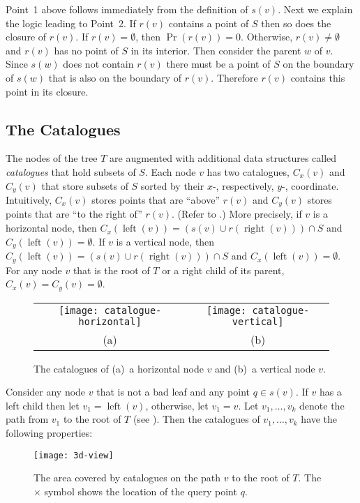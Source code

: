 \documentclass[charterfonts]{patmorin}
\DeclareMathOperator{\lft}{left}
\DeclareMathOperator{\rght}{right}
\begin{document}
Point~1 above follows immediately from the definition of $s(v)$. Next we
explain the logic leading to Point~2.  If $r(v)$ contains a point of $S$
then so does the closure of $r(v)$.   If $r(v)=\emptyset$, then $\Pr(r(v))
= 0$.  Otherwise, $r(v) \neq \emptyset$ and $r(v)$ has no point of $S$ in
its interior.  Then consider the parent $w$ of $v$.  Since $s(w)$ does not
contain $r(v)$ there must be a point of $S$ on the boundary of $s(w)$ that
is also on the boundary of $r(v)$.  Therefore $r(v)$ contains this point in
its closure.

\subsection{The Catalogues}

The nodes of the tree $T$ are augmented with additional data
structures called \emph{catalogues} that hold subsets of $S$.  Each
node $v$ has two catalogues, $C_x(v)$ and $C_y(v)$ that store subsets
of $S$ sorted by their $x$-, respectively, $y$-, coordinate.
Intuitively, $C_x(v)$ stores points that are ``above'' $r(v)$ and
$C_y(v)$ stores points that are ``to the right of'' $r(v)$.  (Refer to
.)  More precisely, if $v$ is a horizontal node,
then $C_x(\lft(v))= (s(v)\cup r(\rght(v)))\cap S$ and
$C_y(\lft(v))=\emptyset$.  If $v$ is a vertical node, then
$C_y(\lft(v)) = (s(v)\cup r(\rght(v)))\cap S$ and
$C_x(\lft(v))=\emptyset$.  For any node $v$ that is the root of $T$ or
a right child of its parent, $C_x(v)=C_y(v)=\emptyset$.  

\begin{figure}
  \begin{center}
    \begin{tabular}{c|c}
      \texttt{[image: catalogue-horizontal]} &
        \texttt{[image: catalogue-vertical]} \\
       (a) & (b) 
    \end{tabular}
  \end{center}
  \caption{The catalogues of (a)~a horizontal node $v$ and (b)~a
  vertical node $v$.}
\end{figure}


Consider any node $v$ that is not a bad leaf and any point $q\in s(v)$.
If $v$ has a left child then let $v_1=\lft(v)$, otherwise, let
$v_1=v$.
Let $v_1,\ldots,v_k$ denote the path from $v_1$ to the root of $T$
(see ).  Then the catalogues of $v_1,\ldots,v_k$ have
the following properties:
\begin{figure}
  \begin{center}
    \texttt{[image: 3d-view]}
  \end{center}
  \caption{The area covered by catalogues on the path $v$ to the root
of $T$. The $\times$ symbol shows the location of the query point $q$.}
\end{figure}
\end{document}
